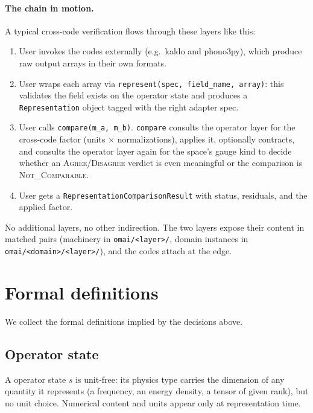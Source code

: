 \documentclass[11pt,a4paper]{article}
\begin{document}
\paragraph{The chain in motion.} A typical cross-code verification flows
through these layers like this:

\begin{enumerate}[leftmargin=2em, itemsep=0.2em]
  \item User invokes the codes externally (e.g.\ kaldo and phono3py),
        which produce raw output arrays in their own formats.
  \item User wraps each array via \texttt{represent(spec, field\_name,
        array)}: this validates the field exists on the operator state
        and produces a \texttt{Representation} object tagged with the
        right adapter spec.
  \item User calls \texttt{compare(m\_a, m\_b)}. \texttt{compare} consults
        the operator layer for the cross-code factor (units \(\times\)
        normalizations), applies it, optionally contracts, and consults the
        operator layer again for the space's gauge kind to decide whether
        an \textsc{Agree}/\textsc{Disagree} verdict is even meaningful or
        the comparison is \textsc{Not\_Comparable}.
  \item User gets a \texttt{RepresentationComparisonResult} with status, residuals,
        and the applied factor.
\end{enumerate}

\noindent No additional layers, no other indirection. The
two layers expose their content in matched pairs (machinery
in \texttt{omai/<layer>/}, domain instances in
\texttt{omai/<domain>/<layer>/}), and the codes attach at the edge.

\medskip

\section{Formal definitions}
\label{sec:defs}

We collect the formal definitions implied by the decisions above.

\subsection{Operator state}

A operator state $s$ is unit-free: its physics type carries the dimension of any
quantity it represents (a frequency, an energy density, a tensor of given rank), but no
unit choice. Numerical content and units appear only at representation time.
\end{document}
